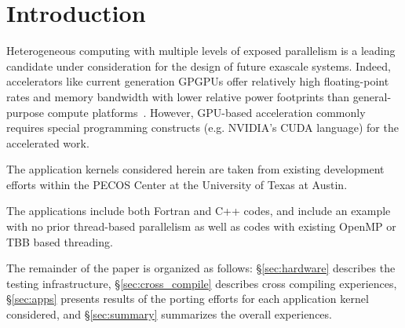\section{Introduction}
\label{sec:intro}

Heterogeneous computing with multiple levels of exposed parallelism is 
a leading candidate under consideration for the design of
future exascale systems.
Indeed, accelerators like
current generation GPGPUs offer relatively high floating-point rates
and memory bandwidth with lower relative power footprints than
general-purpose compute platforms~\cite{gpu_hpc:2009}. However, 
GPU-based acceleration commonly requires special
programming constructs (e.g. NVIDIA's CUDA language) for the
accelerated work.

The application kernels considered herein are taken from existing
development efforts within the PECOS Center at the University of
Texas at Austin.

The applications include 
both Fortran and C++ codes, and include an example with no prior
thread-based parallelism as well as codes with existing OpenMP or TBB
based threading.

The remainder of the paper is organized as follows:
\S\ref{sec:hardware} describes the testing infrastructure,
\S\ref{sec:cross_compile} describes
cross compiling experiences, \S\ref{sec:apps} presents
results of the porting efforts for each application kernel
considered, and \S\ref{sec:summary} summarizes the overall experiences.

